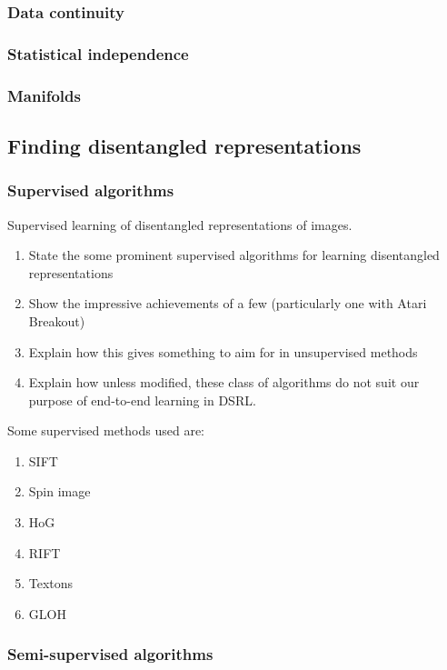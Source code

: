 \documentclass[12pt,twoside]{article}
\begin{document}
\subsubsection{Data continuity}

\subsubsection{Statistical independence}

\subsubsection{Manifolds}

\subsection{Finding disentangled representations}

\subsubsection{Supervised algorithms}

Supervised learning of disentangled representations of images.

\begin{enumerate}
\item State the some prominent supervised algorithms for learning disentangled representations
\item Show the impressive achievements of a few (particularly one with Atari Breakout)
\item Explain how this gives something to aim for in unsupervised methods
\item Explain how unless modified, these class of algorithms do not suit our purpose of end-to-end learning in DSRL.
\end{enumerate}

Some supervised methods used are:

\begin{enumerate}
\item SIFT
\item Spin image
\item HoG
\item RIFT
\item Textons
\item GLOH
\end{enumerate}

\subsubsection{Semi-supervised algorithms}
\end{document}
